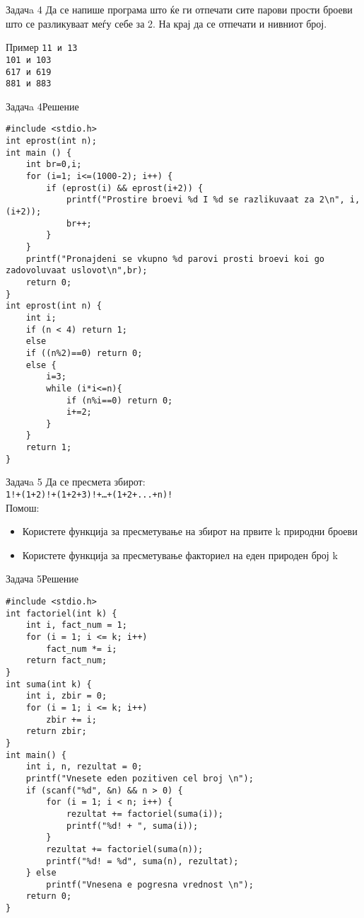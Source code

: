 \begin{frame}{Задачa 4}
Да се напише програма што ќе ги отпечати сите парови прости броеви што се разликуваат меѓу себе за 2. 
На крај да се отпечати и нивниот број.
\begin{exampleblock}{Пример}
\texttt{11 и 13}\\
\texttt{101 и 103}\\
\texttt{617 и 619}\\
\texttt{881 и 883}
\end{exampleblock}
\end{frame}

\begin{frame}[fragile]{Задачa 4}{Решение}
\begin{lstlisting}
#include <stdio.h>
int eprost(int n);
int main () {
    int br=0,i;
    for (i=1; i<=(1000-2); i++) {
        if (eprost(i) && eprost(i+2)) {
            printf("Prostire broevi %d I %d se razlikuvaat za 2\n", i, (i+2));
            br++;
        }
    }
    printf("Pronajdeni se vkupno %d parovi prosti broevi koi go zadovoluvaat uslovot\n",br);
    return 0;
}
int eprost(int n) {
    int i;
    if (n < 4) return 1;
    else
    if ((n%2)==0) return 0;
    else {
        i=3;
        while (i*i<=n){
            if (n%i==0) return 0;
            i+=2;
        }
    }
    return 1;
} 
\end{lstlisting}
\end{frame}

\begin{frame}{Задачa 5}
Да се пресмета збирот:\\
\texttt{1!+(1+2)!+(1+2+3)!+\ldots+(1+2+...+n)!}
\\Помош:\\
\begin{itemize}
    \item Користете функција за пресметување на збирот на првите k природни
  броеви
    \item Користете функција за пресметување факториел на еден природен број k
\end{itemize}
\end{frame}

\begin{frame}[fragile]{Задача 5}{Решение}
\begin{lstlisting}
#include <stdio.h>
int factoriel(int k) {
    int i, fact_num = 1;
    for (i = 1; i <= k; i++)
        fact_num *= i;
    return fact_num;
}
int suma(int k) {
    int i, zbir = 0;
    for (i = 1; i <= k; i++)
        zbir += i;
    return zbir;
}
int main() {
    int i, n, rezultat = 0;
    printf("Vnesete eden pozitiven cel broj \n");
    if (scanf("%d", &n) && n > 0) {
        for (i = 1; i < n; i++) {
            rezultat += factoriel(suma(i));
            printf("%d! + ", suma(i));
        }
        rezultat += factoriel(suma(n));
        printf("%d! = %d", suma(n), rezultat);
    } else
        printf("Vnesena e pogresna vrednost \n");
    return 0;
}
\end{lstlisting}
\end{frame}

